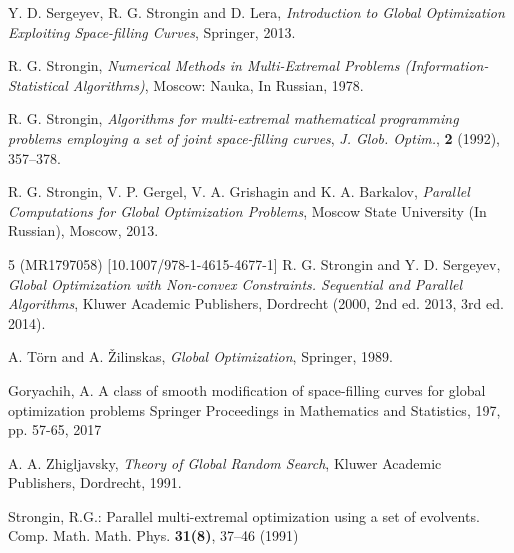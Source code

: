 \documentclass[runningheads]{llncs}
\begin{document}
%
%
% 
% 
%
\begin{thebibliography}{107}

\newblock Y. D. Sergeyev, R. G. Strongin and D. Lera,
\newblock \emph{Introduction to Global Optimization Exploiting Space-filling Curves},
\newblock Springer, 2013.

\newblock R. G. Strongin,
\newblock \emph{Numerical Methods in Multi-Extremal Problems (Information-Statistical
Algorithms)},
\newblock Moscow: Nauka, In Russian, 1978.

\newblock R. G. Strongin,
\newblock \emph{\emph{Algorithms for multi-extremal mathematical programming problems
employing a set of joint space-filling curves}},
\newblock \emph{J. Glob. Optim.}, \textbf{2} (1992), 357--378.

\newblock R. G. Strongin, V. P. Gergel, V. A. Grishagin and K. A. Barkalov,
\newblock \emph{Parallel Computations for Global Optimization Problems},
\newblock Moscow State University (In Russian), Moscow, 2013.

5 (MR1797058) [10.1007/978-1-4615-4677-1]
\newblock R. G. Strongin and Y. D. Sergeyev,
\newblock \emph{Global Optimization with Non-convex Constraints. Sequential and Parallel
Algorithms},
\newblock Kluwer Academic Publishers, Dordrecht (2000, 2nd ed. 2013, 3rd ed. 2014).

\newblock A. T\"orn and A. \v Zilinskas,
\newblock \emph{Global Optimization},
\newblock Springer, 1989.

\newblock Goryachih, A.
\newblock A class of smooth modification of space-filling curves for global optimization
problems
\newblock Springer Proceedings in Mathematics and Statistics, 197, pp. 57-65, 2017

\newblock A. A. Zhigljavsky,
\newblock \emph{Theory of Global Random Search},
\newblock Kluwer Academic Publishers, Dordrecht, 1991.

Strongin, R.G.: Parallel multi-extremal optimization using a set of evolvents. Comp. Math.
Math. Phys. \textbf{31(8)}, 37--46 (1991)


\end{thebibliography}
\end{document}

